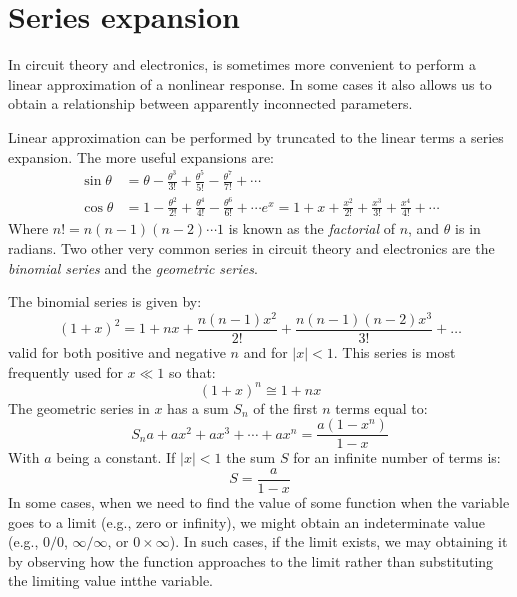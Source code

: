 \section{Series expansion}
In circuit theory and electronics, is sometimes more convenient to perform a linear approximation of a nonlinear response. In some cases it also allows us to obtain a relationship between apparently inconnected parameters.

Linear approximation can be performed by truncated to the linear terms a series expansion. The more useful expansions are:
\begin{equation}
\begin{split}
\sin\theta &= \theta - \frac{\theta^3}{3!} + \frac{\theta^5}{5!} - \frac{\theta^7}{7!} + \cdots\\ 
\cos\theta &= 1 - \frac{\theta^2}{2!} + \frac{\theta^4}{4!} - \frac{\theta^6}{6!} +\cdots
e^x = 1 + x + \frac{x^2}{2!} + \frac{x^3}{3!} + \frac{x^4}{4!}+\cdots  
\end{split}
\end{equation} 
Where $n! = n(n-1)(n-2)\cdots 1$ is known as the \emph{factorial} of $n$, and $\theta$ is in radians.
Two other very common series in circuit theory and electronics are the \emph{binomial series} and the \emph{geometric series}.

The binomial series is given by:
\begin{equation}
(1+x)^2 = 1 + nx + \frac{n(n-1)x^2}{2!} + \frac{n(n-1)(n-2)x^3}{3!} + \ldots 
\end{equation}
valid for both positive and negative $n$ and for $|x|<1$. This series is most frequently used for $x\ll1$ so that:
\begin{equation}
(1+x)^n\cong 1 + nx
\end{equation}
The geometric series in $x$ has a sum $S_n$ of the first $n$ terms equal to:
\begin{equation}
S_n a + ax^2 + ax^3 + \cdots + ax^n = \frac{a(1 - x^n)}{1- x}  
\end{equation}
With $a$ being a constant.
If $|x|<1$ the sum $S$ for an infinite number of terms is:
\begin{equation}
S = \frac{a}{1-x}
\end{equation}
In some cases, when we need to find the value of some function when the variable goes to a limit (e.g., zero or infinity), we might obtain an indeterminate value (e.g., $0/0$, $\infty/\infty$, or $0\times\infty$). In such cases, if the limit exists, we may obtaining it by observing how the function approaches to the limit rather than substituting the limiting value intthe variable.

